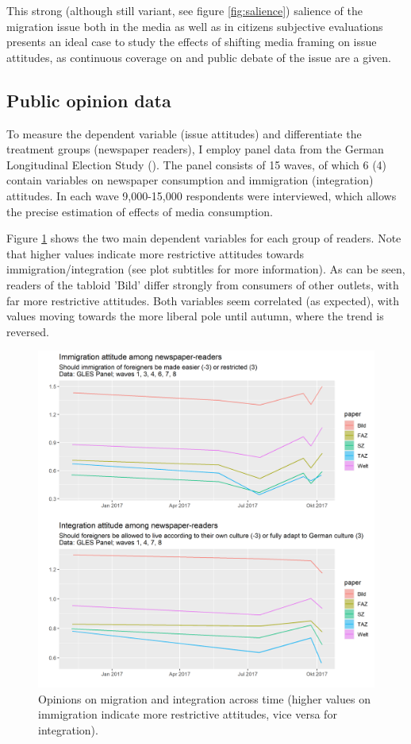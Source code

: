 \documentclass{article}
\begin{document}
This strong (although still variant, see figure \ref{fig:salience}) salience of the migration issue both in the media as well as in citizens subjective evaluations presents an ideal case to study the effects of shifting media framing on issue attitudes, as continuous coverage on and public debate of the issue are a given.

\subsection{Public opinion data}

To measure the dependent variable (issue attitudes) and differentiate the treatment groups (newspaper readers), I employ panel data from the German Longitudinal Election Study (\cite{GLES2019LongTermTracking}). The panel consists of 15 waves, of which 6 (4) contain variables on newspaper consumption and immigration (integration) attitudes. In each wave 9,000-15,000 respondents were interviewed, which allows the precise estimation of effects of media consumption.

Figure \ref{fig:issues} shows the two main dependent variables for each group of readers. Note that higher values indicate more restrictive attitudes towards immigration/integration (see plot subtitles for more information). As can be seen, readers of the tabloid 'Bild' differ strongly from consumers of other outlets, with far more restrictive attitudes. Both variables seem correlated (as expected), with values moving towards the more liberal pole until autumn, where the trend is reversed.

\begin{figure}[!ht]
    \centering
    \includegraphics[width=\textwidth]{paper/vis/issues_readers.png}
    \caption{Opinions on migration and integration across time (higher values on immigration indicate more restrictive attitudes, vice versa for integration).}
    \label{fig:issues}
\end{figure}
\end{document}
